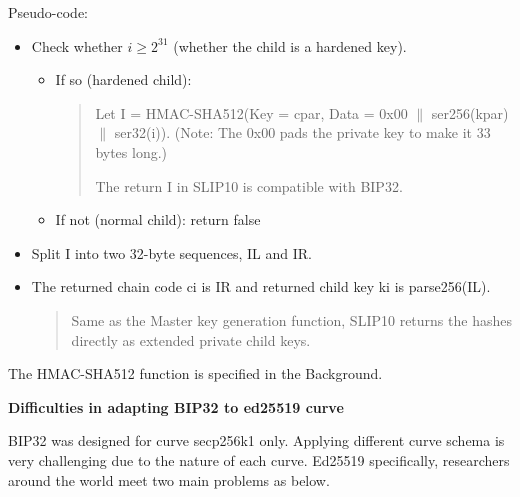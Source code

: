 Pseudo-code:
\begin{itemize}
    \item Check whether $i \geq 2^{31}$ (whether the child is a hardened key).
          \begin{itemize}
              \item If so (hardened child):
                    \begin{quote}

                        Let I = HMAC-SHA512(Key = cpar, Data = 0x00 $\parallel$ ser256(kpar) $\parallel$ ser32(i)). (Note: The 0x00 pads the private key to make it 33 bytes long.)

                        The return I in SLIP10 is compatible with BIP32.
                    \end{quote}

              \item If not (normal child): return false

          \end{itemize}
          \bigskip

    \item Split I into two 32-byte sequences, IL and IR.
          \bigskip

    \item The returned chain code ci is IR and returned child key ki is parse256(IL).
          \begin{quote}
              Same as the Master key generation function, SLIP10 returns the hashes directly as extended private child keys.
          \end{quote}
\end{itemize}

The HMAC-SHA512 function is specified in the Background.

\bigskip
{\textbf{Difficulties in adapting BIP32 to ed25519 curve}}

BIP32 was designed for curve secp256k1 only. Applying different curve schema is very challenging due to the nature of each curve. Ed25519 specifically, researchers around the world meet two main problems as below.


